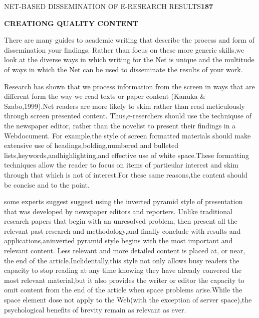 \documentclass[10pt,a4paper]{article}
\begin{document}
\small

\begin{flushright}
NET-BASED DISSEMINATION OF E-RESEARCH RESULTS\quad \textbf{187}
\end{flushright}

\begin{flushleft}
\normalsize
\textbf{CREATIONG QUALITY CONTENT}
\end{flushleft}


There are many guides to academic writing that describe the process and form of dissemination your findings. Rather than focus on these more generic skills,we look at the diverse ways in which writing for the Net is unique and the multitude of ways in which the Net can be used to disseminate the results of your work.

Research has shown that we process information from the screen in ways that are different form the way we read texts or paper content (Kanuka $\&$ Szabo,1999).Net readers are more likely to skim rather than read meticulously through screen presented content. Thus,e-reserchers should use the techniquse of the newspaper editor, rather than the novelist to present their findings in a Webdocument. For example,the style of screen formatted materials should make extensive use of headings,bolding,numbered and bulleted lists,keywords,andhighlighting,and effective use of white space.These formatting techniques allow the reader to focus on items of partieular interest and skim through that which is not of interest.For these same reasons,the content should be concise and to the point.

some experts suggest suggest using the inverted pyramid style of presentation that was developed by newspaper editors and reporters. Unlike traditional research papers that begin with an unresolved problem, then present all the relevant past research and methodology,and finally conclude with results and applications,aninverted pyramid style begins with the most important and relevant content. Less relevant and more detailed content is placed at, or near, the end of the article.Inclidentally,this style not only allows busy readers the capacity to stop reading at any time knowing they have already convered the most relevant material,but it also provides the writer or editor the capacity to omit content from the end of the article when space problems arise.While the space element dose not apply to the Web(with the exception of server space),the psychological benefits of brevity remain as relevant as ever.
\end{document}
